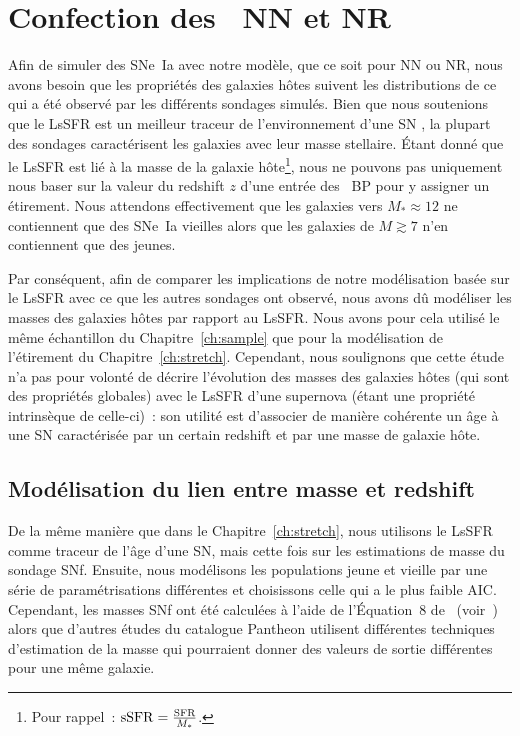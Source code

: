 \documentclass[../main/main.tex]{subfiles}
\begin{document}
\section{Confection des \hostlib\ NN et NR}\label{sec:hmake}

Afin de simuler des SNe~Ia avec notre modèle, que ce soit pour NN ou NR, nous
avons besoin que les propriétés des galaxies hôtes suivent les distributions de
ce qui a été observé par les différents sondages simulés. Bien que nous
soutenions que le LsSFR est un meilleur traceur de l'environnement d'une SN
\citep{briday2022}, la plupart des sondages caractérisent les galaxies avec leur
masse stellaire. Étant donné que le LsSFR est lié à la masse de la galaxie
hôte\footnote{Pour rappel~: $\mathrm{sSFR} = \frac{\rm SFR}{M_*}$.}, nous ne
pouvons pas uniquement nous baser sur la valeur du redshift $z$ d'une entrée des
\hostlib\ BP pour y assigner un étirement. Nous attendons effectivement que les
galaxies vers $M_*\approx12$ ne contiennent que des SNe~Ia vieilles alors que
les galaxies de $M \gtrsim 7$ n'en contiennent que des jeunes.

Par conséquent, afin de comparer les implications de notre modélisation basée
sur le LsSFR avec ce que les autres sondages ont observé, nous avons dû
modéliser les masses des galaxies hôtes par rapport au LsSFR. Nous avons pour
cela utilisé le même échantillon du Chapitre~\ref{ch:sample} que pour la
modélisation de l'étirement du Chapitre~\ref{ch:stretch}. Cependant, nous
soulignons que cette étude n'a pas pour volonté de décrire l'évolution des
masses des galaxies hôtes (qui sont des propriétés globales) avec le LsSFR d'une
supernova (étant une propriété intrinsèque de celle-ci)~: son utilité est
d'associer de manière cohérente un âge à une SN caractérisée par un certain
redshift et par une masse de galaxie hôte.

\subsection{Modélisation du lien entre masse et redshift}\label{ssec:mmod}

De la même manière que dans le Chapitre~\ref{ch:stretch}, nous utilisons le
LsSFR comme traceur de l'âge d'une SN, mais cette fois sur les estimations de
masse du sondage SNf. Ensuite, nous modélisons les populations jeune et vieille
par une série de paramétrisations différentes et choisissons celle qui a le plus
faible AIC. Cependant, les masses SNf ont été calculées à l'aide de l'Équation~8
de~\cite{taylor2011} (voir~\cite{rigault2020}) alors que d'autres études du
catalogue Pantheon utilisent différentes techniques d'estimation de la masse qui
pourraient donner des valeurs de sortie différentes pour une même galaxie.
\end{document}

